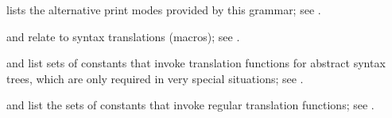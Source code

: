 \begin{isabellebody}
\begin{isamarkuptext}
\begin{description}
\begin{description}
  \item {} lists the alternative print modes
  provided by this grammar; see .

  \item {} and  relate to
  syntax translations (macros); see .

  \item {} and  list sets of constants that invoke
  translation functions for abstract syntax trees, which are only
  required in very special situations; see .

  \item {} and 
  list the sets of constants that invoke regular translation
  functions; see .

  \end{description}
  
  \end{description}%
\end{isamarkuptext}%
\isamarkuptrue%
%
\isadelimtheory
%
\endisadelimtheory
%
\isatagtheory
{}\isamarkupfalse%
%
\endisatagtheory
{\isafoldtheory}%
%
\isadelimtheory
%
\endisadelimtheory
\isanewline
\end{isabellebody}%
